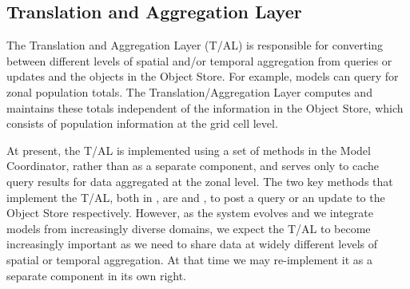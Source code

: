 
\subsection{Translation and Aggregation Layer}
\label{sec:TransAggrLayer}

The Translation and Aggregation Layer ({T/AL}) is responsible for
converting between different levels of spatial and/or temporal aggregation
from queries or updates and the objects in the Object Store.  For example,
models can query for zonal population totals.  The Translation/Aggregation
Layer computes and maintains these totals independent of the information in
the Object Store, which consists of population information at the grid cell
level.

At present, the {T/AL} is implemented using a set of methods in the Model
Coordinator, rather than as a separate component, and serves only to cache
query results for data aggregated at the zonal level.  The two key methods
that implement the {T/AL}, both in , are
 and , to post a query or an update to
the Object Store respectively.  However, as the system evolves and we
integrate models from increasingly diverse domains, we expect the {T/AL}
to become increasingly important as we need to share data at widely
different levels of spatial or temporal aggregation.  At that time we may
re-implement it as a separate component in its own right.


